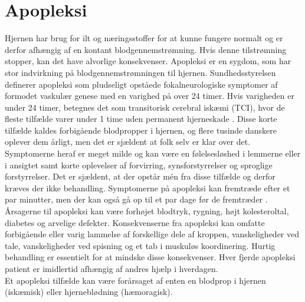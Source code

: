 \section{Apopleksi}
Hjernen har brug for ilt og næringsstoffer for at kunne fungere normalt og er derfor afhængig af en kontant blodgennemstrømning. Hvis denne tilstrømning stopper, kan det have alvorlige konsekvenser. \cite{Hjernesagen2015a} Apopleksi er en sygdom, som har stor indvirkning på blodgennemstrømningen til hjernen. Sundhedsstyrelsen definerer apopleksi som pludseligt opståede fokalneurologiske symptomer af formodet vaskulær genese med en varighed på over 24 timer. \cite{Sundhedsstyrelsen2009} Hvis varigheden er under 24 timer, betegnes det som transitorisk cerebral iskæmi (TCI), hvor de fleste tilfælde varer under 1 time uden permanent hjerneskade \cite{Sundhed.dk2014, Ritter2015}. Disse korte tilfælde kaldes forbigående blodpropper i hjernen, og flere tusinde danskere oplever dem årligt, men det er sjældent at folk selv er klar over det. Symptomerne heraf er meget milde og kan være en følelsesløshed i lemmerne eller i ansigtet samt korte oplevelser af forvirring, synsforstyrrelser og sproglige forstyrrelser. Det er sjældent, at der opstår mén fra disse tilfælde og derfor kræves der ikke behandling. \cite{Hjernesagen2015a,Academic2015} 
Symptomerne på apopleksi kan fremtræde efter et par minutter, men der kan også gå op til et par dage før de fremtræder \cite{Kruuse2014, Academic2015}.
Årsagerne til apopleksi kan være forhøjet blodtryk, rygning, højt kolesteroltal, diabetes og arvelige defekter. Konsekvenserne fra apopleksi kan omfatte forbigående eller varig lammelse af forskellige dele af kroppen, %
vanskeligheder ved tale, vanskeligheder ved spisning og et tab i muskuløs koordinering. \cite{Academic2015} Hurtig behandling er essentielt for at mindske disse konsekvenser. Hver fjerde apopleksi patient er imidlertid afhængig af andres hjælp i hverdagen. \cite{Hjernesagen2015a} \\ %
Et apopleksi tilfælde kan være forårsaget af enten en blodprop i hjernen (iskæmisk) eller hjerneblødning (hæmoragisk). \cite{Ritter2015} 

